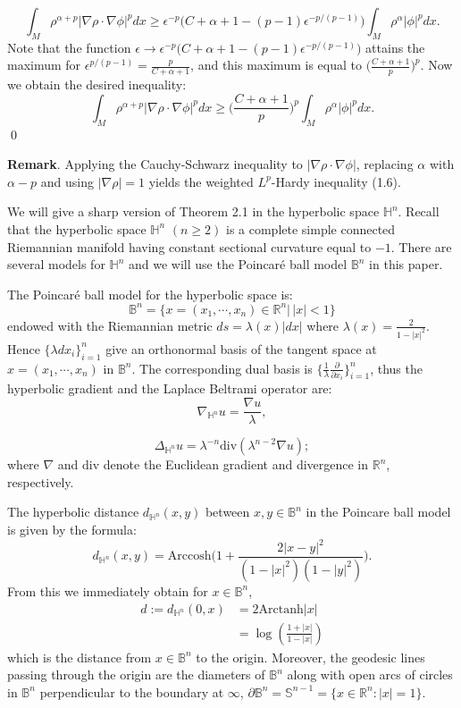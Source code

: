 \documentclass[12pt]{amsart}
\numberwithin{equation}{section}
\numberwithin{theorem}{section}
\numberwithin{theorem}{section} \numberwithin{lemma}{section}
\numberwithin{definition}{section}
\numberwithin{corollary}{section}
\numberwithin{remark}{section}
\numberwithin{proposition}{section}
\begin{document}
\begin{equation}
\int_M \rho^{\alpha+p}|\nabla \rho\cdot \nabla \phi|^p dx\ge
\epsilon^{-p}\Big(C+\alpha+1-(p-1)\epsilon^{-p/(p-1)}\Big) \int_M
\rho^{\alpha}|\phi|^pdx.
\end{equation} Note that the function $\epsilon \longrightarrow
\epsilon^{-p}\Big(C+\alpha+1-(p-1)\epsilon^{-p/(p-1)}\Big)$
attains the maximum for $\epsilon^{p/(p-1)}=\frac{p}{C+\alpha+1}$,
and this maximum is equal to  $\Big(\frac{C+\alpha+1}{p}\Big)^p$.
Now we obtain the desired inequality: \[\int_M
\rho^{\alpha+p}|\nabla \rho\cdot \nabla \phi|^p dx \ge
\Big(\frac{C+\alpha+1}{p}\Big)^p \int_M \rho^{\alpha}|\phi|^pdx.\]
\qed

 \noindent\textbf{Remark}. Applying the Cauchy-Schwarz
inequality to $|\nabla\rho\cdot \nabla\phi|$,  replacing $\alpha$
with $\alpha-p$ and using $|\nabla\rho|=1$ yields the weighted
$L^p$-Hardy inequality (1.6).
\medskip

We will give a sharp version of Theorem 2.1 in  the hyperbolic space
$\mathbb{H}^n$. Recall that the hyperbolic space $\mathbb{H}^n$
$(n\ge 2)$ is a complete simple connected Riemannian manifold having
constant sectional curvature equal to $-1$. There are several models
for $\mathbb{H}^n$ and we will use the Poincar\'e ball model
$\mathbb{B}^n$ in this paper.
\medskip

The Poincar\'e ball model for the hyperbolic space is:
\[\mathbb{B}^n=\{x=(x_1, \cdots, x_n) \in \mathbb{R}^n |\, |x|<1\}\]
endowed  with the Riemannian metric $ds=\lambda(x)|dx|$ where
$\lambda(x)=\frac{2}{1-|x|^2}$. Hence $\{\lambda dx_i\}_{i=1}^{n}$
give an orthonormal basis of the tangent space at $x=(x_1,\cdots,
x_n)$ in $\mathbb{B}^n$. The corresponding dual basis is
$\{\frac{1}{\lambda}\frac{\partial}{\partial x_i}\}_{i=1}^{n}$,
thus the hyperbolic gradient and the Laplace Beltrami operator
are:
\[\nabla_{\mathbb{H}^n}u=\frac{\nabla
u}{\lambda},\]

\[\Delta_{\mathbb{H}^n}u=\lambda^{-n}\text{div}(\lambda^{n-2}\nabla u)
;\] where $\nabla$ and $\text{div}$ denote the Euclidean  gradient
and divergence in $\mathbb{R}^n$, respectively.

 The
hyperbolic distance $d_{\mathbb{H}^n}(x,y)$ between
$x,y\in\mathbb{B}^n$ in the Poincare ball model is given by the
formula:
\[d_{\mathbb{H}^n}(x,y)=\text{Arccosh}\Big(1+\frac{2|x-y|^2}{(1-|x|^2)(1-|y|^2)}\Big).\]
From this we immediately obtain for $x\in \mathbb{B}^n$,
\[ \begin{aligned} d:=d_{\mathbb{H}^n}(0,x)&=2\text{Arctanh} |x|\\
&=\log (\frac{1+|x|}{1-|x|})\end{aligned}\] which is the distance
from $x\in \mathbb{B}^n$ to the origin. Moreover, the geodesic
lines passing through the origin are the diameters of $
\mathbb{B}^n$ along with open arcs of circles in $\mathbb{B}^n$
perpendicular to the boundary at $\infty$, $\partial
\mathbb{B}^n=\mathbb{S}^{n-1}= \{x\in \mathbb{R}^n: |x|=1\}$.
\end{document}
